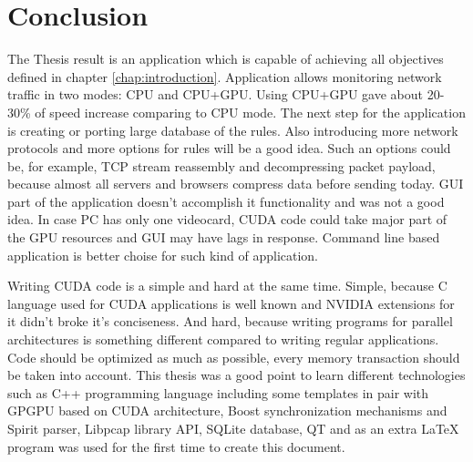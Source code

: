 \documentclass[thesis=M,english]{FITthesis}[2011/07/15]
\begin{document}
\chapter{Conclusion}
The Thesis result is an application which is capable of achieving all objectives defined in chapter \ref{chap:introduction}. Application allows monitoring network traffic in two modes: CPU and CPU+GPU. Using CPU+GPU gave about 20-30\% of speed increase comparing to CPU mode. The next step for the application is creating or porting large database of the rules. Also introducing more network protocols and more options for rules will be a good idea. Such an options could be, for example, TCP stream reassembly and decompressing packet payload, because almost all servers and browsers compress data before sending today. GUI part of the application doesn't accomplish it functionality and was not a good idea. In case PC has only one videocard, CUDA code could take major part of the GPU resources and GUI may have lags in response. Command line based application is better choise for such kind of application.

Writing CUDA code is a simple and hard at the same time. Simple, because C language used for CUDA applications is well known and NVIDIA extensions for it didn't broke it's conciseness. And hard, because writing programs for parallel architectures is something different compared to writing regular applications. Code should be optimized as much as possible, every memory transaction should be taken into account. This thesis was a good point to learn different technologies such as C++ programming language including some templates in pair with GPGPU based on CUDA architecture, Boost synchronization mechanisms and Spirit parser, Libpcap library API, SQLite database, QT and as an extra \LaTeX{} program was used for the first time to create this document.




\appendix
\end{document}
